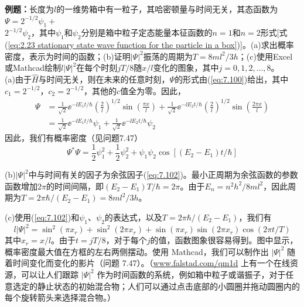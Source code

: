     \begin{examplebox}
        \textbf{例题：}长度为$l$的一维势箱中有一粒子，其哈密顿量与时间无关，其态函数为$\Psi = 2^{-1/2}\psi_1+ $\\$ 2^{-1/2}\psi_2$，其中$\psi_1$和$\psi_2$分别是箱中粒子定态能量本征函数的$n=1$和$n=2$形式[式(\ref{eq:2.23 stationary state wave function for the particle in a box})]。(a)求出概率密度，表示为时间的函数；(b)证明$\left|\Psi\right|^2$振荡的周期为$T = 8ml^2/3h$；(c)使用Excel或Mathcad绘制$l\left|\Psi\right|^2$在每个时刻$jT/8$随$x/l$变化的图象，其中$j=0,1,2,\ldots,8$。
        \\

        (a)由于$\hat{H}$与时间无关，则在未来的任意时刻，$\Psi$的形式由(\ref{eq:7.100})给出，其中$c_1=2^{-1/2}$，$c_2=2^{-1/2}$，其他的$c$值全为零。因此，
        \begin{equation*}
            \begin{aligned}
                \Psi &= \frac{1}{\sqrt{2}}\ee ^{-\ii E_1t/\hbar}\left(\frac{2}{l}\right)^{1/2}\sin\left(\frac{\pi x}{l}\right) + \frac{1}{\sqrt{2}}\ee ^{-\ii E_2t/\hbar}\left(\frac{2}{l}\right)^{1/2}\sin\left(\frac{2\pi x}{l}\right) \\
                & = \frac{1}{\sqrt{2}}\ee ^{-\ii E_1t/\hbar}\psi_1 + \frac{1}{\sqrt{2}}\ee ^{-\ii E_2t/\hbar}\psi_2
            \end{aligned}
        \end{equation*}
        因此，我们有概率密度（见问题7.47）
        \begin{equation}
            \Psi^{\ast}\Psi = \frac{1}{2}\psi_1^2+\frac{1}{2}\psi_2^2 + \psi_1\psi_2\cos\left[\left(E_2-E_1\right)t/\hbar\right]
            \label{eq:7.102}
        \end{equation}

        (b)$\left|\Psi\right|^2$中与时间有关的因子为余弦因子(\ref{eq:7.102})。最小正周期为余弦函数的参数函数增加$2\pi$的时间间隔，即$\left(E_2-E_1\right)T/\hbar = 2\pi$。由于$E_n = n^2h^2/8ml^2$，因此周期为$T = 2\pi\hbar/\left(E_2-E_1\right) = 8ml^2/3h$。

        (c)使用(\ref{eq:7.102})和$\psi_1$、$\psi_2$的表达式，以及$T = 2\pi\hbar/\left(E_2-E_1\right)$，我们有
        \begin{equation}
            l\left|\Psi\right|^2 = \sin^2\left(\pi x_r\right) + \sin^2\left(2\pi x_r\right) + \sin\left(\pi x_r\right)\sin\left(2\pi x_r\right)\cos\left(2\pi t/T\right)
            \label{eq:7.103}
        \end{equation}
        其中$x_r = x/l$。由于$t = jT/8$，对于每个$j$的值，函数图象很容易得到。图中显示，概率密度最大值在方框的左右两侧摆动。使用 Mathcad，我们可以制作出 $\left|\Psi\right|^2$ 随着时间变化而变化的影片（问题 7.47）。（\url{www.falstad.com/qm1d} 上有一个在线资源，可以让人们跟踪 $\left|\Psi\right|^2$ 作为时间函数的系统，例如箱中粒子或谐振子，对于任意选定的静止状态的初始混合物；人们可以通过点击底部的小圆圈并拖动圆圈内的每个旋转箭头来选择混合物。）
    \end{examplebox}

